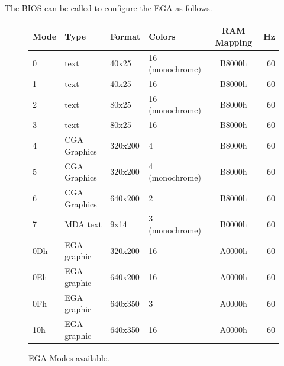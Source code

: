 \documentclass[book.tex]{subfiles}
\begin{document}
The BIOS can be called to configure the EGA as follows.
\vspace{-10pt}
\begin{figure}[H]
\centering
\begin{table}[H]
\begin{tabularx}{\textwidth}[c]{llllcr}
\hline
\textbf{Mode} & \textbf{Type} & \textbf{Format} & \textbf{Colors} & \hspace{10pt}\textbf{RAM Mapping}\hspace{10pt} & \textbf{Hz}        \\ \hline
0             & text          & 40x25           & 16 (monochrome) & B8000h     & 60                           \\ \hline
1             & text          & 40x25           & 16              & B8000h    & 60                            \\ \hline
2             & text          & 80x25           & 16 (monochrome) & B8000h    & 60                            \\ \hline
3             & text          & 80x25           & 16              & B8000h    & 60                            \\ \hline
4             & CGA Graphics  & 320x200         & 4               & B8000h    & 60                            \\ \hline
5             & CGA Graphics  & 320x200         & 4 (monochrome)  & B8000h    & 60                            \\ \hline
6             & CGA Graphics  & 640x200         & 2               & B8000h    & 60                            \\ \hline
7             & MDA text      & 9x14            & 3 (monochrome)  & B0000h    & 60                            \\ \hline
0Dh           & EGA graphic   & 320x200         & 16              & A0000h    & 60                            \\ \hline
0Eh           & EGA graphic   & 640x200         & 16              & A0000h    & 60                            \\ \hline
0Fh           & EGA graphic   & 640x350         & 3               & A0000h    & 60                            \\ \hline
10h           & EGA graphic   & 640x350         & 16              & A0000h    & 60                            \\ \hline
\end{tabularx}
\end{table}
\caption{EGA Modes available.}
\label{ega-modes-available}
 \end{figure}
 
\end{document}
